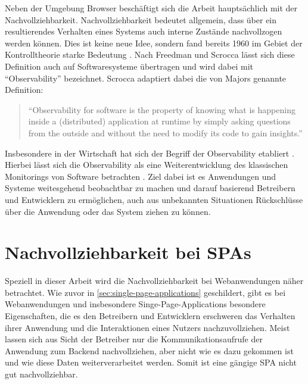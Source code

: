 Neben der Umgebung Browser beschäftigt sich die Arbeit hauptsächlich mit der Nachvollziehbarkeit. Nachvollziehbarkeit bedeutet allgemein, dass über ein resultierendes Verhalten eines Systems auch interne Zustände nachvollzogen werden können. Dies ist keine neue Idee, sondern fand bereits 1960 im Gebiet der Kontrolltheorie starke Bedeutung \cite{OnTheGeneralTheoryOfControlSystems}. Nach Freedman \cite{TestabilityOfSoftwareComponents} und Scrocca \etal \cite{TheKaijuProjectPaper} lässt sich diese Definition auch auf Softwaresysteme übertragen und wird dabei mit \enquote{Observability} bezeichnet. Scrocca adaptiert dabei die von Majors \cite{MajorsObservability} genannte Definition:

\begin{quotation}
\enquote{Observability for software is the property of knowing what is happening inside a (distributed) application at runtime by simply asking questions from the outside and without the need to modify its code to gain insights.}
\end{quotation}

Insbesondere in der Wirtschaft hat sich der Begriff der Observability etabliert \cite{DynatraceObservability} \cite{NewRelicObservability}. Hierbei lässt sich die Observability als eine Weiterentwicklung des klassischen Monitorings von Software betrachten \cite{TheNewStackMonitoringAndObservability}. Ziel dabei ist es Anwendungen und Systeme weitesgehend beobachtbar zu machen und darauf basierend Betreibern und Entwicklern zu ermöglichen, auch aus unbekannten Situationen Rückschlüsse über die Anwendung oder das System ziehen zu können.

\section{Nachvollziehbarkeit bei SPAs}
\label{sec:nachvollziehbarkeit-bei-spas}

Speziell in dieser Arbeit wird die Nachvollziehbarkeit bei Webanwendungen näher betrachtet. Wie zuvor in \autoref{sec:single-page-applications} geschildert, gibt es bei Webanwendungen und insbesondere Singe-Page-Applications besondere Eigenschaften, die es den Betreibern und Entwicklern erschweren das Verhalten ihrer Anwendung und die Interaktionen eines Nutzers nachzuvollziehen. Meist lassen sich aus Sicht der Betreiber nur die Kommunikationsaufrufe der Anwendung zum Backend nachvollziehen, aber nicht wie es dazu gekommen ist und wie diese Daten weiterverarbeitet werden. Somit ist eine gängige SPA nicht gut nachvollziehbar.

